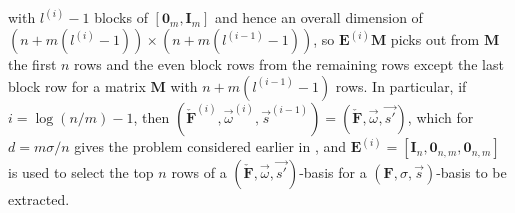  with $l^{\left(i\right)}-1$ blocks of $\left[\mathbf{0}_{m},\mathbf{I}_{m}\right]$
and hence an overall dimension of $(n+m(l^{\left(i\right)}-1))\times(n+m(l^{\left(i-1\right)}-1))$,
so $\mathbf{E}^{\left(i\right)}\mathbf{M}$ picks out from $\mathbf{M}$
the first $n$ rows and the even block rows from the remaining rows
except the last block row for a matrix $\mathbf{M}$ with $n+m(l^{\left(i-1\right)}-1)$
rows. In particular, if $i=\log\left(n/m\right)-1$, then $(\check{\mathbf{F}}^{\left(i\right)},\vec{\omega}^{\left(i\right)},\vec{s}^{\left(i-1\right)})=(\check{\mathbf{F}},\vec{\omega},\vec{s'})$,
which for $d=m\sigma/n$ gives the problem considered earlier in ,
and $\mathbf{E}^{\left(i\right)}=\left[\mathbf{I}_{n},\mathbf{0}_{n,m},\mathbf{0}_{n,m}\right]$
is used to select the top $n$ rows of a $(\check{\mathbf{F}},\vec{\omega},\vec{s'})$-basis
for a $\left(\mathbf{F},\sigma,\vec{s}\right)$-basis to be extracted.

